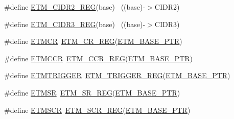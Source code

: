 \begin{DoxyCompactItemize}
\item 
\#define \hyperlink{group___e_t_m___register___accessor___macros_gae7a2fd221fe7ac5b6819b2502c415e5a}{E\+T\+M\+\_\+\+C\+I\+D\+R2\+\_\+\+R\+EG}(base)                                        ~((base)-\/$>$C\+I\+D\+R2)
\item 
\#define \hyperlink{group___e_t_m___register___accessor___macros_ga4a3ddd5f2bbd41dcd9b8b5cada551f0a}{E\+T\+M\+\_\+\+C\+I\+D\+R3\+\_\+\+R\+EG}(base)                                        ~((base)-\/$>$C\+I\+D\+R3)
\item 
\#define \hyperlink{group___e_t_m___register___accessor___macros_ga1a5f52be7c6b362dff119d6a785035ba}{E\+T\+M\+CR}~\hyperlink{group___e_t_m___register___accessor___macros_ga7066d0e177775ee655bcca10375aef57}{E\+T\+M\+\_\+\+C\+R\+\_\+\+R\+EG}(\hyperlink{group___e_t_m___peripheral_ga5f573e73b1defe379e4a2e666d2e47c7}{E\+T\+M\+\_\+\+B\+A\+S\+E\+\_\+\+P\+TR})
\item 
\#define \hyperlink{group___e_t_m___register___accessor___macros_gab02f525097935c0a43de5416b592e375}{E\+T\+M\+C\+CR}~\hyperlink{group___e_t_m___register___accessor___macros_gac577bf385fd3f99d9a8188ab9088dfd8}{E\+T\+M\+\_\+\+C\+C\+R\+\_\+\+R\+EG}(\hyperlink{group___e_t_m___peripheral_ga5f573e73b1defe379e4a2e666d2e47c7}{E\+T\+M\+\_\+\+B\+A\+S\+E\+\_\+\+P\+TR})
\item 
\#define \hyperlink{group___e_t_m___register___accessor___macros_ga3a5e3e16780224cc28fb0867d9dfd93f}{E\+T\+M\+T\+R\+I\+G\+G\+ER}~\hyperlink{group___e_t_m___register___accessor___macros_gaf1c431dfad05a82a1d959cd58a990a0c}{E\+T\+M\+\_\+\+T\+R\+I\+G\+G\+E\+R\+\_\+\+R\+EG}(\hyperlink{group___e_t_m___peripheral_ga5f573e73b1defe379e4a2e666d2e47c7}{E\+T\+M\+\_\+\+B\+A\+S\+E\+\_\+\+P\+TR})
\item 
\#define \hyperlink{group___e_t_m___register___accessor___macros_gacd765d3e050b4d26f061f12c5a522130}{E\+T\+M\+SR}~\hyperlink{group___e_t_m___register___accessor___macros_ga6a4e9d22d51bd337409f36921e9d285d}{E\+T\+M\+\_\+\+S\+R\+\_\+\+R\+EG}(\hyperlink{group___e_t_m___peripheral_ga5f573e73b1defe379e4a2e666d2e47c7}{E\+T\+M\+\_\+\+B\+A\+S\+E\+\_\+\+P\+TR})
\item 
\#define \hyperlink{group___e_t_m___register___accessor___macros_ga35dc6d35cfc0a556d6f851664551abd3}{E\+T\+M\+S\+CR}~\hyperlink{group___e_t_m___register___accessor___macros_ga093217f1b3c1f107ad12524096650e20}{E\+T\+M\+\_\+\+S\+C\+R\+\_\+\+R\+EG}(\hyperlink{group___e_t_m___peripheral_ga5f573e73b1defe379e4a2e666d2e47c7}{E\+T\+M\+\_\+\+B\+A\+S\+E\+\_\+\+P\+TR})
\item 

\end{DoxyCompactItemize}
